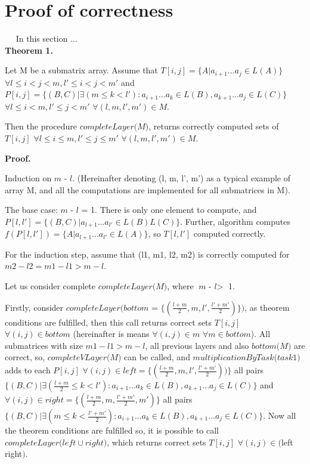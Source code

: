 \documentclass{article}
\begin{document}
\section{Proof of correctness}

 $\quad$ In this section ...\\

\textbf{Theorem 1.}

Let M be a submatrix array. Assume that $T[i, j] =  \{ A |  a_{i + 1}...a_{j} \in L(A)\}$ $\forall l \leq i < j < m,  l' \leq i < j < m'$ and $P[i, j] =  \{ (B, C) |\exists (m \le k < l'): a_{i + 1}...a_{k} \in L(B), a_{k + 1}...a_{j} \in L(C)\}$ $\forall l \leq i < m,  l' \leq j < m'$ $\forall (l, m, l', m') \in M$.

Then the procedure $\textit{completeLayer(M)}$, returns correctly computed sets of $T[i, j]$ $\forall l \leq i \le m,  l' \leq j \le m'$ $\forall (l, m, l', m') \in M$. 

\textbf{Proof.}

Induction on $\textit{m - l}$. (Hereinafter denoting (l, m, l', m') as a typical example of array M, and all the computations are implemented for all submatrices in M).

The base case: $\textit{m - l}$ = 1. There is only one element to compute, and $P[l, l'] =  \{ (B, C) |  a_{l + 1}...a_{l'} \in L(B)L(C)\}$. Further, algorithm computes $f(P[l, l']) = \{ A |  a_{l + 1}...a_{l'} \in L(A)\}$, so $T[l, l']$ computed correctly.

For the induction step, assume that (l1, m1, l2, m2) is correctly computed for $m2 - l2 = m1 - l1 > m - l$.

Let us consider complete $\textit{completeLayer(M)}$, where $\textit{m - l} >$ 1.

Firstly, consider $\textit{completeLayer(bottom = \{$(\frac{l+m}{2}, m, l', \frac{l'+m'}{2})$\})}$, as theorem conditions are fulfilled, then this call returns correct sets $T[i, j]$ $\forall (i, j) \in bottom$ (hereinafter is means $\forall (i, j) \in m$ $\forall m \in bottom$). All submatrices with size $ m1 - l1 > m - l$, all previous layers and also $\textit{bottom(M)}$ are correct, so, $\textit{completeVLayer(M)}$ can be called, and $\textit{multiplicationByTask(task1)}$ adds to each $P[i, j]$ $\forall (i, j) \in left = \{(\frac{l+m}{2}, m, l', \frac{l'+m'}{2}))\}$ all pairs $\{ (B, C) |\exists (\frac{l+m}{2} \le k < l'): a_{i + 1}...a_{k} \in L(B), a_{k + 1}...a_{j} \in L(C)\}$ and $\forall (i, j) \in right = \{(\frac{l+m}{2}, m, \frac{l'+m'}{2}, m')\}$ all pairs $\{ (B, C) |\exists (m \le k < \frac{l'+m'}{2}): a_{i + 1}...a_{k} \in L(B), a_{k + 1}...a_{j} \in L(C)\}$. Now all the theorem conditions are fulfilled so, it is possible to call $\textit{completeLayer($left \cup right$)}$, which returns correct sets $T[i, j]$ $\forall (i, j) \in ($left \cup right$)$. 
\end{document}
